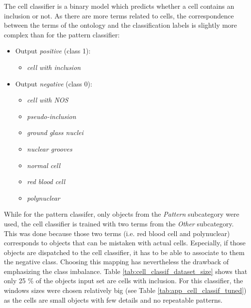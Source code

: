The cell classifier is a binary model which predicts whether a cell contains an inclusion or not. As there are more terms related to cells, the correspondence between the terms of the ontology and the classification labels is slightly more complex than for the pattern classifier:

\begin{itemize}
	\item Output \textit{positive} (class 1): 
	\begin{itemize}
		\item \textit{cell with inclusion}
	\end{itemize}
	\item Output \textit{negative} (class 0): 
	\begin{itemize}
		\item \textit{cell with NOS}
		\item \textit{pseudo-inclusion}
		\item \textit{ground glass nuclei}
		\item \textit{nuclear grooves}
		\item \textit{normal cell}
		\item \textit{red blood cell}
		\item \textit{polynuclear}
	\end{itemize}
\end{itemize}

While for the pattern classifer, only objects from the \textit{Pattern} subcategory were used, the cell classifier is trained with two terms from the \textit{Other} subcategory. This was done because those two terms (i.e. red blood cell and polynuclear) corresponds to objects that can be mistaken with actual cells. Especially, if those objects are dispatched to the cell classifier, it has to be able to associate to them the negative class. Choosing this mapping has nevertheless the drawback of emphasizing the class imbalance. Table \ref{tab:cell_classif_dataset_size} shows that only 25 \% of the objects input set are cells with inclusion. For this classifier, the windows sizes were chosen relatively big (see Table \ref{tab:app_cell_classif_tuned}) as the cells are small objects with few details and no repeatable patterns. 

